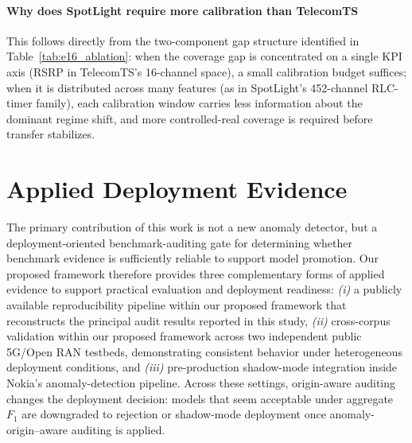 \documentclass[sigconf,review]{acmart}
\begin{document}
\paragraph{Why does SpotLight require more calibration than TelecomTS}
This follows directly from the two-component gap structure identified 
in Table~\ref{tab:e16_ablation}: when the coverage gap is concentrated 
on a single KPI axis (RSRP in TelecomTS's 16-channel space), a small 
calibration budget suffices; when it is distributed across many 
features (as in SpotLight's 452-channel RLC-timer family), each 
calibration window carries less information about the dominant regime 
shift, and more controlled-real coverage is required before transfer 
stabilizes.

\section{Applied Deployment Evidence}
\label{sec:applied}

The primary contribution of this work is not a new anomaly detector, but a deployment-oriented benchmark-auditing gate for determining whether benchmark evidence is sufficiently reliable to support model promotion. Our proposed framework therefore provides three complementary forms of applied evidence to support practical evaluation and deployment readiness: \emph{(i)} a publicly available reproducibility pipeline within our proposed framework that reconstructs the principal audit results reported in this study, \emph{(ii)} cross-corpus validation within our proposed framework across two independent public 5G/Open RAN testbeds, demonstrating consistent behavior under heterogeneous deployment conditions, and \emph{(iii)} pre-production shadow-mode integration inside Nokia's anomaly-detection pipeline. Across these settings, origin-aware auditing changes the deployment decision: models that seem acceptable under aggregate $F_1$ are downgraded to rejection or shadow-mode deployment once anomaly-origin–aware auditing is applied.
\end{document}
